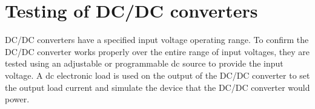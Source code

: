 \section{Testing of DC/DC converters}
DC/DC converters have a specified input voltage operating range. To confirm the DC/DC converter works properly over the entire range of input voltages, they are tested using an adjustable or programmable dc source to provide the input voltage. A dc electronic load is used on the output of the DC/DC converter to set the output load current and simulate the device that the DC/DC converter would power.


